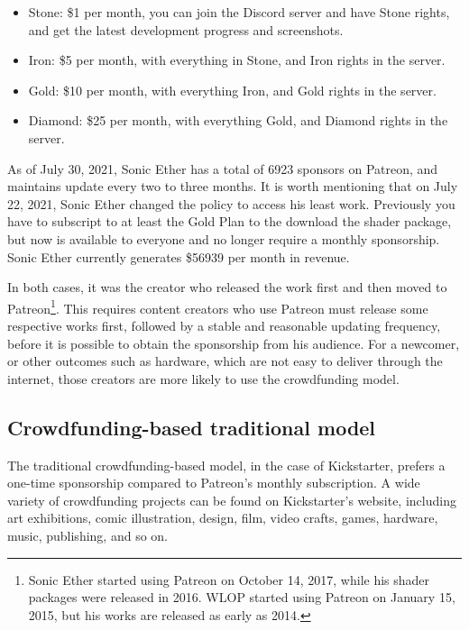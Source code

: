 \documentclass[12pt,a4paper]{article}
\begin{document}
    \begin{itemize}
        \item Stone: \$1 per month, you can join the Discord server and have Stone rights, and get the latest development progress and screenshots.
        \item Iron: \$5 per month, with everything in Stone, and Iron rights in the server.
        \item Gold: \$10 per month, with everything Iron, and Gold rights in the server.
        \item Diamond: \$25 per month, with everything Gold, and Diamond rights in the server.
    \end{itemize}

    As of July 30, 2021, Sonic Ether has a total of 6923 sponsors on Patreon,
    and maintains update every two to three months. It is worth mentioning that
    on July 22, 2021, Sonic Ether changed the policy to access his least work.
    Previously you have to subscript to at least the Gold Plan to the download
    the shader package, but now is available to everyone and no longer require
    a monthly sponsorship. Sonic Ether currently generates \$56939 per month in revenue.

    In both cases, it was the creator who released the work first and then
    moved to Patreon\footnote{
        Sonic Ether started using Patreon on October 14, 2017,
        while his shader packages were released in 2016.
        WLOP started using Patreon on January 15, 2015,
        but his works are released as early as 2014.
    }. This requires content creators who use Patreon
    must release some respective works first, followed by a stable and
    reasonable updating frequency, before it is possible to obtain the
    sponsorship from his audience.
    For a newcomer, or other outcomes such as hardware, which are not
    easy to deliver through the internet, those creators are more likely
    to use the crowdfunding model.

    \subsection{Crowdfunding-based traditional model}\label{subsec:tradition_kickstarter}

    The traditional crowdfunding-based model, in the case of Kickstarter,
    prefers a one-time sponsorship compared to Patreon's monthly subscription.
    A wide variety of crowdfunding projects can be found on Kickstarter's
    website\cite{kickstarter_homepage}, including art exhibitions, comic illustration,
    design, film, video crafts, games, hardware, music, publishing, and so on.
\end{document}
